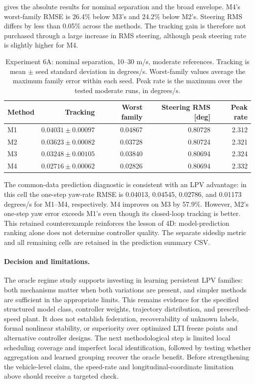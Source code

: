  gives the absolute results for nominal separation and the
broad envelope. M4's worst-family RMSE is 26.4\% below M3's and 24.2\% below
M2's. Steering RMS differs by less than 0.05\% across the methods. The tracking
gain is therefore not purchased through a large increase in RMS steering,
although peak steering rate is slightly higher for M4.

\begin{table}[htbp]
\centering
\caption{Experiment 6A: nominal separation, 10--30 m/s, moderate references.
Tracking is mean $\pm$ seed standard deviation in degrees/s. Worst-family
values average the maximum family error within each seed. Peak rate is the
maximum over the tested moderate runs, in degrees/s.}
\label{tab:6a-nominal}
\begin{tabular}{lrrrr}
\toprule
Method & Tracking & Worst family & Steering RMS [deg] & Peak rate\\
\midrule
M1 & $0.04031\pm0.00097$ & 0.04867 & 0.80728 & 2.312\\
M2 & $0.03623\pm0.00082$ & 0.03728 & 0.80724 & 2.321\\
M3 & $0.03248\pm0.00105$ & 0.03840 & 0.80694 & 2.324\\
M4 & $0.02716\pm0.00062$ & 0.02826 & 0.80694 & 2.332\\
\bottomrule
\end{tabular}
\end{table}

The common-data prediction diagnostic is consistent with an LPV advantage:
in this cell the one-step yaw-rate RMSE is 0.04013, 0.04545, 0.02786, and
0.01173 degrees/s for M1--M4, respectively. M4 improves on M3 by 57.9\%.
However, M2's one-step yaw error exceeds M1's even though its closed-loop
tracking is better. This retained counterexample reinforces the lesson of
4D: model-prediction ranking alone does not determine controller quality.
The separate sideslip metric and all remaining cells are retained in the
prediction summary CSV.

\paragraph{Decision and limitations.}
The oracle regime study supports investing in learning persistent LPV families:
both mechanisms matter when both variations are present, and simpler methods
are sufficient in the appropriate limits. This remains evidence for the
specified structured model class, controller weights, trajectory distribution,
and prescribed-speed plant. It does not establish federation, recoverability
of unknown labels, formal nonlinear stability, or superiority over optimized
LTI freeze points and alternative controller designs. The next methodological
step is limited local scheduling coverage and imperfect local identification,
followed by testing whether aggregation and learned grouping recover the oracle
benefit. Before strengthening the vehicle-level claim, the speed-rate and
longitudinal-coordinate limitation above should receive a targeted check.

